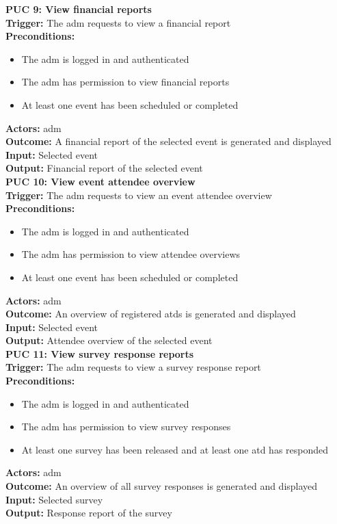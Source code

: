 \documentclass[12pt]{article}
\begin{document}
{\textbf{PUC 9: View financial reports} \\
\textbf{Trigger:} The \gls{adm} requests to view a financial report \\
\textbf{Preconditions:}
\begin{itemize}
  \item The \gls{adm} is logged in and authenticated
  \item The \gls{adm} has permission to view financial reports
  \item At least one event has been scheduled or completed
\end{itemize}
\textbf{Actors:} \Gls{adm} \\
\textbf{Outcome:} A financial report of the selected event is generated and displayed \\
\textbf{Input:} Selected event \\
\textbf{Output:} Financial report of the selected event \\[1em]

\textbf{PUC 10: View event attendee overview} \\
\textbf{Trigger:} The \gls{adm} requests to view an event attendee overview \\
\textbf{Preconditions:}
\begin{itemize}
  \item The \gls{adm} is logged in and authenticated
  \item The \gls{adm} has permission to view attendee overviews
  \item At least one event has been scheduled or completed
\end{itemize}
\textbf{Actors:} \Gls{adm} \\
\textbf{Outcome:} An overview of registered \glspl{atd} is generated and displayed \\
\textbf{Input:} Selected event \\
\textbf{Output:} Attendee overview of the selected event \\[1em]

\textbf{PUC 11: View survey response reports} \\
\textbf{Trigger:} The \gls{adm} requests to view a survey response report \\
\textbf{Preconditions:}
\begin{itemize}
  \item The \gls{adm} is logged in and authenticated
  \item The \gls{adm} has permission to view survey responses
  \item At least one survey has been released and at least one \gls{atd} has responded
\end{itemize}
\textbf{Actors:} \Gls{adm} \\
\textbf{Outcome:} An overview of all survey responses is generated and displayed \\
\textbf{Input:} Selected survey \\
\textbf{Output:} Response report of the survey \\[1em]

}
\end{document}
